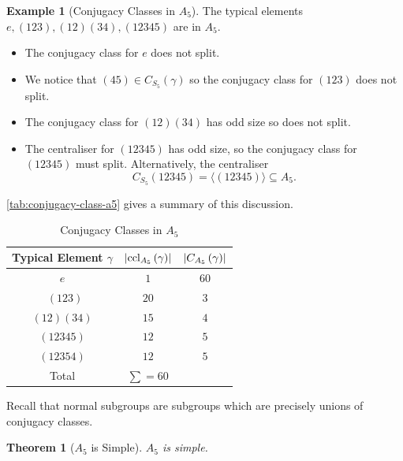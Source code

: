 \documentclass{article}
\newtheorem{theorem}{Theorem}[section]
\theoremstyle{definition}
\newtheorem*{example*}{Example}
\theoremstyle{remark}
\DeclarePairedDelimiter{\abs}{\lvert}{\rvert}
\newcommand{\pqty}[1]{\left(#1\right)}
\newcommand{\angBrac}[1]{\langle #1\rangle}
\newcommand{\perm}[1]{(#1)}
\newcommand{\ccl}{\operatorname{ccl}}
\begin{document}
\begin{example*}[Conjugacy Classes in \(A_5\)]
    The typical elements \(e, \perm{123}, \perm{12}\perm{34}, \perm{12345}\) are in \(A_5\).
    \begin{itemize}
        \item The conjugacy class for \(e\) does not split.
        \item We notice that \(\perm{45} \in C_{S_5} \pqty{\gamma}\) so the conjugacy class for \(\perm{123}\) does not split.
        \item The conjugacy class for \(\perm{12} \perm{34}\) has odd size so does not split.
        \item The centraliser for \(\perm{12345}\) has odd size, so the conjugacy class for \(\perm{12345}\) must split. Alternatively, the centraliser
        \[
            C_{S_5} \perm{12345} = \angBrac{\perm{12345}} \subseteq A_5.
        \]
    \end{itemize}

    \autoref{tab:conjugacy-class-a5} gives a summary of this discussion.
\end{example*}

\begin{table}[ht!]
    \centering
    \begin{tabular}{ccc}
        Typical Element \(\gamma\) & \(\abs{\ccl_{A_5} \pqty{\gamma}}\) & \(\abs{C_{A_5} \pqty{\gamma}}\)\\
        \hline\hline
        \(e\) & \(1\) & \(60\) \\\
        \(\perm{123}\) & \(20\) & \(3\) \\
        \(\perm{12} \perm{34}\) & \(15\) & \(4\) \\
        \(\perm{12345}\) & \(12\) & \(5\) \\
        \(\perm{12354}\) & \(12\) & \(5\) \\
        \hline
        Total & \(\sum = 60\) &
    \end{tabular}
    \caption{Conjugacy Classes in \(A_5\)}
    \label{tab:conjugacy-class-a5}
\end{table}

Recall that normal subgroups are subgroups which are precisely unions of conjugacy classes.

\begin{theorem}[\(A_5\) is Simple]
    \label{thm:a5-is-simple}%
    \(A_5\) is simple.
\end{theorem}
\end{document}
